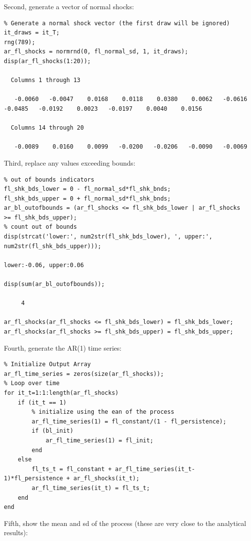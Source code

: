 \documentclass[
]{book}
\begin{document}
Second, generate a vector of normal shocks:

\begin{verbatim}
% Generate a normal shock vector (the first draw will be ignored)
it_draws = it_T;
rng(789);
ar_fl_shocks = normrnd(0, fl_normal_sd, 1, it_draws);
disp(ar_fl_shocks(1:20));

  Columns 1 through 13

   -0.0060   -0.0047    0.0168    0.0118    0.0380    0.0062   -0.0616   -0.0485   -0.0192    0.0023   -0.0197    0.0040    0.0156

  Columns 14 through 20

   -0.0089    0.0160    0.0099   -0.0200   -0.0206   -0.0090   -0.0069
\end{verbatim}

Third, replace any values exceeding bounds:

\begin{verbatim}
% out of bounds indicators
fl_shk_bds_lower = 0 - fl_normal_sd*fl_shk_bnds;
fl_shk_bds_upper = 0 + fl_normal_sd*fl_shk_bnds;
ar_bl_outofbounds = (ar_fl_shocks <= fl_shk_bds_lower | ar_fl_shocks >= fl_shk_bds_upper);
% count out of bounds
disp(strcat('lower:', num2str(fl_shk_bds_lower), ', upper:', num2str(fl_shk_bds_upper)));

lower:-0.06, upper:0.06

disp(sum(ar_bl_outofbounds));

     4

ar_fl_shocks(ar_fl_shocks <= fl_shk_bds_lower) = fl_shk_bds_lower;
ar_fl_shocks(ar_fl_shocks >= fl_shk_bds_upper) = fl_shk_bds_upper;
\end{verbatim}

Fourth, generate the AR(1) time series:

\begin{verbatim}
% Initialize Output Array
ar_fl_time_series = zeros(size(ar_fl_shocks));
% Loop over time
for it_t=1:1:length(ar_fl_shocks)
    if (it_t == 1)
        % initialize using the ean of the process
        ar_fl_time_series(1) = fl_constant/(1 - fl_persistence);
        if (bl_init)
            ar_fl_time_series(1) = fl_init;            
        end
    else
        fl_ts_t = fl_constant + ar_fl_time_series(it_t-1)*fl_persistence + ar_fl_shocks(it_t);
        ar_fl_time_series(it_t) = fl_ts_t;
    end
end
\end{verbatim}

Fifth, show the mean and sd of the process (these are very close to the
analytical results):
\end{document}
